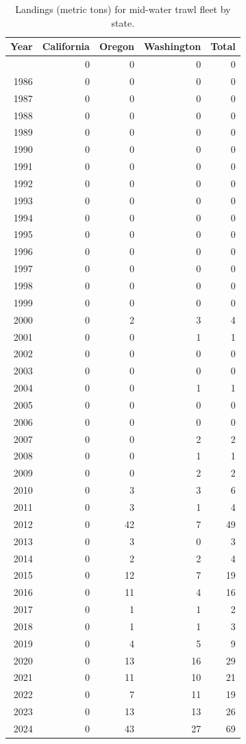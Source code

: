 \documentclass[
]{scrartcl}
\begin{document}
\begin{longtable}{rrrrr}

\caption{\label{tbl-MDT_landings}Landings (metric tons) for mid-water
trawl fleet by state.}

\tabularnewline

\toprule
Year & California & Oregon & Washington & Total \\ 
\midrule\addlinespace[2.5pt]
1985 & 0 & 0 & 0 & 0 \\ 
1986 & 0 & 0 & 0 & 0 \\ 
1987 & 0 & 0 & 0 & 0 \\ 
1988 & 0 & 0 & 0 & 0 \\ 
1989 & 0 & 0 & 0 & 0 \\ 
1990 & 0 & 0 & 0 & 0 \\ 
1991 & 0 & 0 & 0 & 0 \\ 
1992 & 0 & 0 & 0 & 0 \\ 
1993 & 0 & 0 & 0 & 0 \\ 
1994 & 0 & 0 & 0 & 0 \\ 
1995 & 0 & 0 & 0 & 0 \\ 
1996 & 0 & 0 & 0 & 0 \\ 
1997 & 0 & 0 & 0 & 0 \\ 
1998 & 0 & 0 & 0 & 0 \\ 
1999 & 0 & 0 & 0 & 0 \\ 
2000 & 0 & 2 & 3 & 4 \\ 
2001 & 0 & 0 & 1 & 1 \\ 
2002 & 0 & 0 & 0 & 0 \\ 
2003 & 0 & 0 & 0 & 0 \\ 
2004 & 0 & 0 & 1 & 1 \\ 
2005 & 0 & 0 & 0 & 0 \\ 
2006 & 0 & 0 & 0 & 0 \\ 
2007 & 0 & 0 & 2 & 2 \\ 
2008 & 0 & 0 & 1 & 1 \\ 
2009 & 0 & 0 & 2 & 2 \\ 
2010 & 0 & 3 & 3 & 6 \\ 
2011 & 0 & 3 & 1 & 4 \\ 
2012 & 0 & 42 & 7 & 49 \\ 
2013 & 0 & 3 & 0 & 3 \\ 
2014 & 0 & 2 & 2 & 4 \\ 
2015 & 0 & 12 & 7 & 19 \\ 
2016 & 0 & 11 & 4 & 16 \\ 
2017 & 0 & 1 & 1 & 2 \\ 
2018 & 0 & 1 & 1 & 3 \\ 
2019 & 0 & 4 & 5 & 9 \\ 
2020 & 0 & 13 & 16 & 29 \\ 
2021 & 0 & 11 & 10 & 21 \\ 
2022 & 0 & 7 & 11 & 19 \\ 
2023 & 0 & 13 & 13 & 26 \\ 
2024 & 0 & 43 & 27 & 69 \\ 
\bottomrule

\end{longtable}
\end{document}
